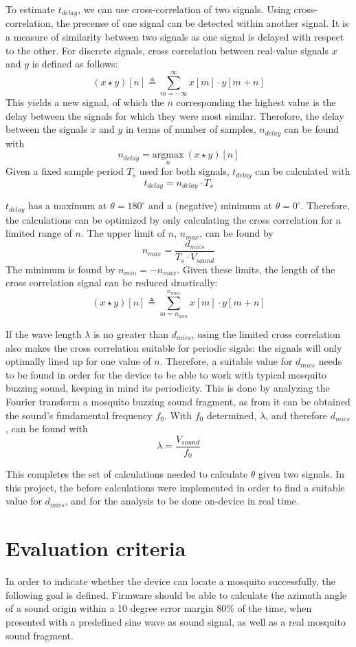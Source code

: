\documentclass[a4paper]{article}
\begin{document}
To estimate $t_{delay}$, we can use cross-correlation of two signals. Using cross-correlation, the precense of one signal can be detected within another signal. It is a measure of similarity between two signals as one signal is delayed with respect to the other. For discrete signals, cross correlation between real-value signals $x$ and $y$ is defined as follows: \[(x \star y)[n] \triangleq \sum_{m = -\infty}^ {\infty} x[m]\cdot y[m + n]\] This yields a new signal, of which the $n$ corresponding the highest value is the delay between the signals for which they were most similar. Therefore, the delay between the signals $x$ and $y$ in terms of number of samples, $n_{delay}$ can be found with \[n_{delay} = \underset{n}{\mathrm{argmax}}\ (x \star y)[n]\] Given a fixed sample period $T_s$ used for both signals, $t_{delay}$ can be calculated with \[t_{delay} = n_{delay} \cdot T_s\]

$t_{delay}$ has a maximum at $\theta = 180^{\circ}$ and a (negative) minimum at $\theta = 0^{\circ}$. Therefore, the calculations can be optimized by only calculating the cross correlation for a limited range of $n$. The upper limit of $n$, $n_{max}$, can be found by \[n_{max} = \frac{d_{mics}}{T_s \cdot V_{sound}}\] The minimum is found by $n_{min} = -n_{max}$. Given these limits, the length of the cross correlation signal can be reduced drastically:\[(x \star y)[n] \triangleq \sum_{m = n_{min}}^ {n_{max}} x[m]\cdot y[m + n]\] 

If the wave length $\lambda$ is no greater than $d_{mics}$, using the limited cross correlation also makes the cross correlation suitable for periodic sigals: the signals will only optimally lined up for one value of $n$. Therefore, a suitable value for $d_{mics}$ needs to be found in order for the device to be able to work with typical mosquito buzzing sound, keeping in mind its periodicity. This is done by analyzing the Fourier transform a mosquito buzzing sound fragment\cite{mosquito_fragment}, as from it can be obtained the sound's fundamental frequency $f_0$. With $f_0$ determined, $\lambda$, and therefore $d_{mics}$, can be found with \[\lambda = \frac{V_{sound}}{f_0}\]

This completes the set of calculations needed to calculate $\theta$ given two signals. In this project, the before calculations were implemented in order to find a suitable value for $d_{mics}$, and for the analysis to be done on-device in real time.

\section{Evaluation criteria}
In order to indicate whether the device can locate a mosquito successfully, the following goal is defined. Firmware should be able to calculate the azimuth angle of a sound origin within a 10 degree error margin 80\% of the time, when presented with a predefined sine wave as sound signal, as well as a real mosquito sound fragment.
\end{document}

